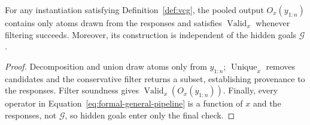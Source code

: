 \begin{proposition}
\label{prop:composable-transfer}
For any instantiation satisfying Definition~\ref{def:vcg}, the pooled output
\(O_x(y_{1:n})\) contains only atoms drawn from the responses and satisfies
\(\operatorname{Valid}_x\) whenever filtering succeeds.  Moreover, its
construction is independent of the hidden goals \(\mathcal G\).
\end{proposition}

\begin{proof}
Decomposition and union draw atoms only from \(y_{1:n}\);
\(\operatorname{Unique}_x\) removes candidates and the conservative filter
returns a subset, establishing provenance to the responses.  Filter soundness
gives \(\operatorname{Valid}_x(O_x(y_{1:n}))\).  Finally, every operator in
Equation~\eqref{eq:formal-general-pipeline} is a function of \(x\) and the
responses, not \(\mathcal G\), so hidden goals enter only the final check.
\end{proof}
